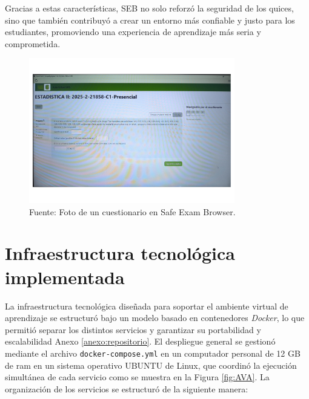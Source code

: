\documentclass[letter,oneside,12pt,spanish]{report}
\begin{document}
Gracias a estas características, SEB no solo reforzó la seguridad de los quices, sino que también contribuyó a crear un entorno más confiable y justo para los estudiantes, promoviendo una experiencia de aprendizaje más seria y comprometida.

\begin{figure}[ht]
	\centering
	\includegraphics[width=0.8\textwidth]{Figs/SEB.pdf}
	\label{fig:SEB}
	\\Fuente: Foto de un cuestionario en Safe Exam Browser.
\end{figure}

\section{Infraestructura tecnológica implementada}

La infraestructura tecnológica diseñada para soportar el ambiente virtual de aprendizaje se estructuró bajo un modelo basado en contenedores \textit{Docker}, lo que permitió separar los distintos servicios y garantizar su portabilidad y escalabilidad Anexo \ref{anexo:repositorio}. El despliegue general se gestionó mediante el archivo \texttt{docker-compose.yml} en un computador personal de 12 GB de ram en un sistema operativo UBUNTU de Linux, que coordinó la ejecución simultánea de cada servicio como se muestra en la Figura \ref{fig:AVA}. La organización de los servicios se estructuró de la siguiente manera:
\end{document}
